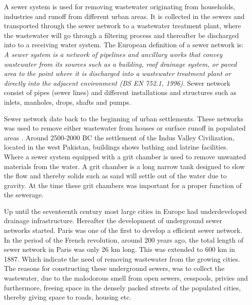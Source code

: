 A sewer system is used for removing wastewater originating from households, industries and runoff from different urban areas. It is collected in the sewers and transported through the sewer network to a wastewater treatment plant, where the wastewater will go through a filtering process and thereafter be discharged into to a receiving water system. The European definition of a sewer network is: \textit{A sewer system is a network of pipelines and ancillary works that convey wastewater from its sources such as a building, roof drainage system, or paved area to the point where it is discharged into a wastewater treatment plant or directly into the adjacent environment (BS EN 752.1, 1996)}. Sewer network consist of pipes (sewer lines) and different installations and structures such as inlets, manholes, drops, shafts and pumps.

Sewer network date back to the beginning of urban settlements. These networks was used to remove either wastewater from houses or surface runoff in populated areas . Around 2500-2000 BC the settlement of the Indus Valley Civilization, located in the west Pakistan, buildings shows bathing and latrine facilities. Where a sewer system equipped with a grit chamber is used to remove unwanted materials from the water. A grit chamber is a long narrow tank designed to slow the flow and thereby solids such as sand will settle out of the water due to gravity. At the time these grit chambers was important for a proper function of the sewerage.

Up until the seventeenth century most large cities in Europe had underdeveloped drainage infrastructure. Hereafter the development of underground sewer networks started. Paris was one of the first to develop a efficient sewer network. In the period of the French revolution, around 200 years ago, the total length of sewer network in Paris was only 26 km long. This was extended to 600 km in 1887. Which indicate the need of removing wastewater from the growing cities. The reasons for constructing these underground sewers, was to collect the wastewater, due to the malodorous smell from open sewers, cesspools, privies and furthermore, freeing space in the densely packed streets of the populated cities, thereby giving space to roads, housing etc.
 

